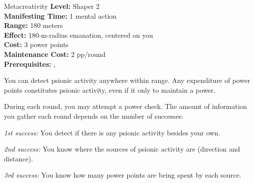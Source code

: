 {Metacreativity}
{
	\textbf{Level:}
	Shaper 2\\
	\textbf{Manifesting Time:}
	1 mental action\\
	\textbf{Range:}
	180 meters\\
	\textbf{Effect:}
	180-m-radius emanation, centered on you\\
	\textbf{Cost:}
	3 power points\\
	\textbf{Maintenance Cost:}
	2 pp/round\\
	\textbf{Prerequisites:}
	, \\
}
{
	You can detect psionic activity anywhere within range. Any expenditure of power points constitutes psionic activity, even if it only to maintain a power.

	During each round, you may attempt a power check. The amount of information you gather each round depends on the number of successes:

	\textit{1st success:} You detect if there is any psionic activity besides your own.

	\textit{2nd success:} You know where the sources of psionic activity are (direction and distance).

	\textit{3rd success:} You know how many power points are being spent by each source.
}